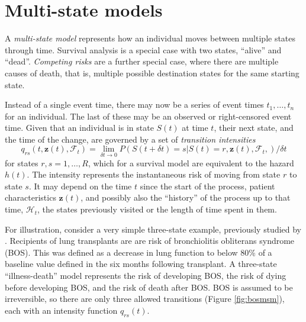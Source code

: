 \documentclass[nojss,nofooter]{jss}
\begin{document}
\section{Multi-state models}
\label{sec:multistate}

A \emph{multi-state model} represents how an individual moves between
multiple states through time.  Survival analysis is a special case
with two states, ``alive'' and ``dead''.  \emph{Competing risks} are a
further special case, where there are multiple causes of death, that
is, multiple possible destination states for the same starting
state.  

Instead of a single event time, there may now be a series of event
times $t_{1},\dots, t_{n}$ for an individual.  The last of these may
be an observed or right-censored event time.  Given that an individual
is in state $S(t)$ at time $t$, their next state, and the time of the
change, are governed by a set of \emph{transition intensities}
\[q_{rs}(t,\mathbf{z}(t),\mathcal{F}_t) = \lim_{\delta t \rightarrow 0} P(S(t+\delta t) = s | S(t) = r, \mathbf{z}(t), \mathcal{F}_t, ) / \delta t \] 
for states $r, s = 1,\dots,R$, which for a survival model
are equivalent to the hazard $h(t)$.  The intensity represents the
instantaneous risk of moving from state $r$ to state $s$.  It may
depend on the time $t$ since the start of the process, patient
characteristics $\mathbf{z}(t)$, and possibly also the ``history'' of
the process up to that time, $\mathcal{H}_t$, the states previously
visited or the length of time spent in them.

For illustration, consider a very simple three-state example,
previously studied by \citet{heng:paper}. Recipients of lung
transplants are are risk of bronchiolitis obliterans syndrome (BOS).
This was defined as a decrease in lung function to below 80\% of a
baseline value defined in the six months following transplant.  A
three-state ``illness-death'' model represents the risk of developing
BOS, the risk of dying before developing BOS, and the risk of death
after BOS.  BOS is assumed to be irreversible, so there are only three
allowed transitions (Figure \ref{fig:bosmsm}), each with an intensity
function $q_{rs}(t)$.
\end{document}
